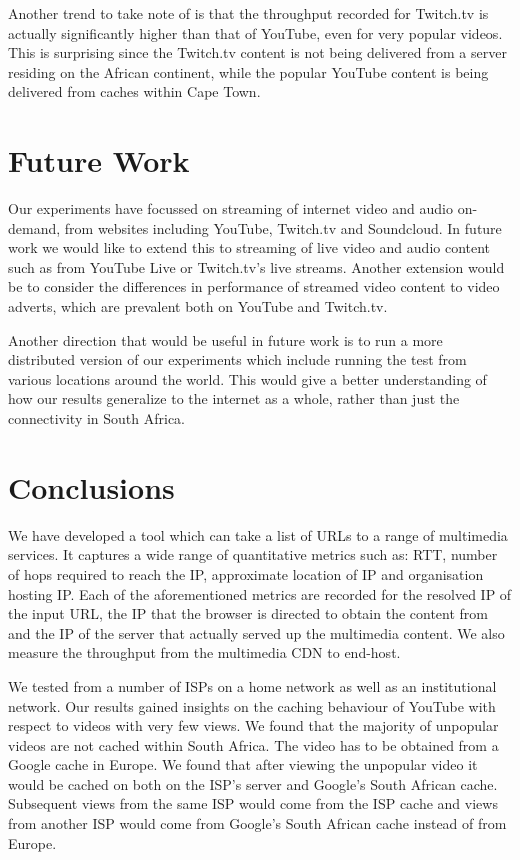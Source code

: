 \documentclass{sig-alternate-05-2015}
\begin{document}
Another trend to take note of is that the throughput recorded for Twitch.tv is actually significantly higher than that of YouTube, even for very popular videos. This is surprising since the Twitch.tv content is not being delivered from a server residing on the African continent, while the popular YouTube content is being delivered from caches within Cape Town.

\section{Future Work}\label{sec:futurework}
Our experiments have focussed on streaming of internet video and audio on-demand, from websites including YouTube, Twitch.tv and Soundcloud. In future work we would like to extend this to streaming of live video and audio content such as from YouTube Live or Twitch.tv's live streams. Another extension would be to consider the differences in performance of streamed video content to video adverts, which are prevalent both on YouTube and Twitch.tv.

Another direction that would be useful in future work is to run a more distributed version of our experiments which include running the test from various locations around the world. This would give a better understanding of how our results generalize to the internet as a whole, rather than just the connectivity in South Africa.

\section{Conclusions}
We have developed a tool which can take a list of URLs to a range of multimedia services. It captures a wide range of quantitative metrics such as: RTT, number of hops required to reach the IP, approximate location of IP and organisation hosting IP. Each of the aforementioned metrics are recorded for the resolved IP of the input URL, the IP that the browser is directed to obtain the content from and the IP of the server that actually served up the multimedia content. We also measure the throughput from the multimedia CDN to end-host.

We tested from a number of ISPs on a home network as well as an institutional network. Our results gained insights on the caching behaviour of YouTube with respect to videos with very few views. We found that the majority of unpopular videos are not cached within South Africa. The video has to be obtained from a Google cache in Europe. We found that after viewing the unpopular video it would be cached on both on the ISP's server and Google's South African cache. Subsequent views from the same ISP would come from the ISP cache and views from another ISP would come from Google's South African cache instead of from Europe.
\end{document}
